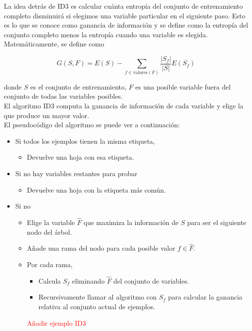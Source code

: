 La idea detrás de ID3 es calcular cuánta entropía del conjunto de entrenamiento completo disminuirá si elegimos una variable particular en el siguiente paso. Esto es lo que se conoce como ganancia de información y se define como la entropía del conjunto completo menos la entropía cuando una variable es elegida. Matemáticamente, se define como

\begin{equation}
G(S, F) = E(S) - \sum_{f \in \text{valores}(F)} \dfrac{|S_f|}{|S|} E(S_f)
\end{equation}

donde $S$ es el conjunto de entrenamiento, $F$ es una posible variable fuera del conjunto de todas las variables posibles.\\

El algoritmo ID3 computa la ganancia de información de cada variable y elige la que produce un mayor valor.\\

El pseudocódigo del algoritmo se puede ver a continuación:

\begin{itemize}
\item Si todos los ejemplos tienen la misma etiqueta,

\begin{itemize}
\item Devuelve una hoja con esa etiqueta.
\end{itemize}

\item Si no hay variables restantes para probar

\begin{itemize}
\item Devuelve una hoja con la etiqueta más común.
\end{itemize}

\item Si no

\begin{itemize}
\item Elige la variable $\hat{F}$ que maximiza la información de $S$ para ser el siguiente nodo del árbol.
\item Añade una rama del nodo para cada posible valor $f \in \hat{F}$.
\item Por cada rama,

\begin{itemize}
\item Calcula $S_f$ eliminando $\hat{F}$ del conjunto de variables.
\item Recursivamente llamar al algoritmo con $S_f$ para calcular la ganancia relativa al conjunto actual de ejemplos.
\end{itemize}

\begin{ejemplo}
\textcolor{red}{Añadir ejemplo ID3}
\end{ejemplo}

\end{itemize}

\end{itemize}

